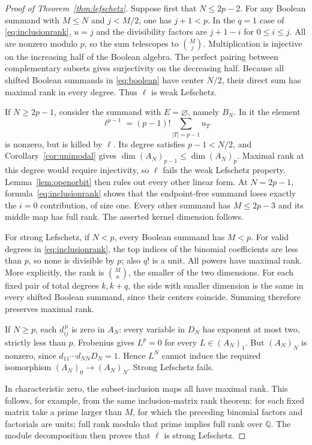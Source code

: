 \documentclass[11pt]{article}
\theoremstyle{definition}
\theoremstyle{remark}
\numberwithin{equation}{section}
\begin{document}
\begin{proof}[Proof of Theorem~\ref{thm:lefschetz}]
Suppose first that $N\leq2p-2$. For any Boolean summand with $M\leq N$
and $j<M/2$, one has $j+1<p$. In the $q=1$ case of
\eqref{eq:inclusionrank}, $u=j$ and the divisibility factors are
$j+1-i$ for $0\leq i\leq j$. All are nonzero modulo $p$, so the sum
telescopes to $\binom{M}{j}$. Multiplication is injective on the
increasing half of the Boolean algebra. The perfect pairing between
complementary subsets gives surjectivity on the decreasing half.
Because all shifted Boolean summands in \eqref{eq:boolean} have center
$N/2$, their direct sum has maximal rank in every degree. Thus $\ell$
is weak Lefschetz.

If $N\geq2p-1$, consider the summand with $E=\varnothing$, namely
$B_N$. In it the element
\[
 \ell^{p-1}=(p-1)!\sum_{|T|=p-1}u_T
\]
is nonzero, but is killed by $\ell$. Its degree satisfies
$p-1<N/2$, and Corollary~\ref{cor:unimodal} gives
$\dim(A_N)_{p-1}\leq\dim(A_N)_p$. Maximal rank at this degree would
require injectivity, so $\ell$ fails the weak Lefschetz property.
Lemma~\ref{lem:openorbit} then rules out every other linear form.
At $N=2p-1$, formula~\eqref{eq:inclusionrank} shows that the
endpoint-free summand loses exactly the $i=0$ contribution, of size
one. Every other summand has $M\leq2p-3$ and its middle map has full
rank. The asserted kernel dimension follows.

For strong Lefschetz, if $N<p$, every Boolean summand has $M<p$.
For valid degrees in \eqref{eq:inclusionrank}, the top indices of the
binomial coefficients are less than $p$, so none is divisible by $p$;
also $q!$ is a unit. All powers have maximal rank. More explicitly,
the rank is $\binom{M}{u}$, the smaller of the two dimensions.
For each fixed pair of total degrees $k,k+q$, the side with smaller
dimension is the same in every shifted Boolean summand, since their
centers coincide. Summing therefore preserves maximal rank.

If $N\geq p$, each $d_{ij}^{\,p}$ is zero in $A_N$: every variable in
$D_N$ has exponent at most two, strictly less than $p$. Frobenius gives
$L^p=0$ for every $L\in(A_N)_1$. But $(A_N)_N$ is nonzero, since
$d_{11}\cdots d_{NN}D_N=1$. Hence $L^N$ cannot induce the required
isomorphism $(A_N)_0\to(A_N)_N$. Strong Lefschetz fails.

In characteristic zero, the subset-inclusion maps all have maximal
rank. This follows, for example, from the same inclusion-matrix rank
theorem: for each fixed matrix take a prime larger than $M$, for which
the preceding binomial factors and factorials are units; full rank
modulo that prime implies full rank over $\mathbb Q$. The module
decomposition then proves that $\ell$ is strong Lefschetz.
\end{proof}
\end{document}
